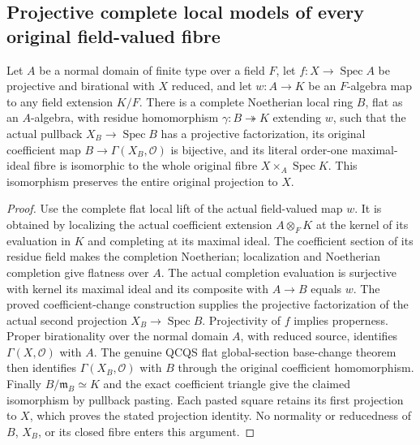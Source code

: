 \subsection{Projective complete local models of every original field-valued fibre}

\begin{theorem}
\label{thm:fc-projective-completed-local-fibre-model}
\leanok
{}
Let $A$ be a normal domain of finite type over a field $F$, let
$f:X\to\operatorname{Spec}A$ be projective and birational with $X$ reduced,
and let $w:A\to K$ be an $F$-algebra map to any field extension $K/F$.
There is a complete Noetherian local ring $B$, flat as an $A$-algebra,
with residue homomorphism $\gamma:B\twoheadrightarrow K$ extending $w$,
such that the actual pullback $X_B\to\operatorname{Spec}B$ has a projective
factorization, its original coefficient map $B\to\Gamma(X_B,\mathcal O)$
is bijective, and its literal order-one maximal-ideal fibre is isomorphic
to the whole original fibre $X\times_A\operatorname{Spec}K$. This
isomorphism preserves the entire original projection to $X$.
\end{theorem}
\begin{proof}
Use the complete flat local lift of the actual field-valued map $w$.
It is obtained by localizing the actual coefficient extension
$A\otimes_F K$ at the kernel of its evaluation in $K$ and completing at
its maximal ideal. The coefficient section of its residue field makes
the completion Noetherian; localization and Noetherian completion give
flatness over $A$. The actual completion evaluation is surjective with
kernel its maximal ideal and its composite with $A\to B$ equals $w$.
The proved coefficient-change construction supplies the projective
factorization of the actual second projection $X_B\to\operatorname{Spec}B$.
Projectivity of $f$ implies properness. Proper birationality over the
normal domain $A$, with reduced source, identifies $\Gamma(X,\mathcal O)$
with $A$. The genuine QCQS flat global-section base-change theorem then
identifies $\Gamma(X_B,\mathcal O)$ with $B$ through the original
coefficient homomorphism. Finally $B/\mathfrak m_B\simeq K$ and the
exact coefficient triangle give the claimed isomorphism by pullback
pasting. Each pasted square retains its first projection to $X$, which
proves the stated projection identity. No normality or reducedness of
$B$, $X_B$, or its closed fibre enters this argument.
\end{proof}
